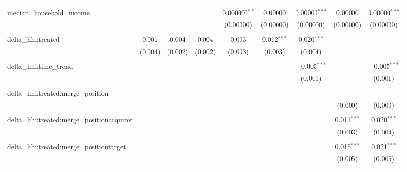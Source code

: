 \begin{table}[H]
{\begin{tabular}{@{\extracolsep{5pt}}lcccccccc}
   & & & & & & & & \\  

  median\_household\_income &  &  &  & 0.00000$^{***}$ & 0.00000 & 0.00000$^{***}$ & 0.00000 & 0.00000$^{***}$ \\  

   &  &  &  & (0.00000) & (0.00000) & (0.00000) & (0.00000) & (0.00000) \\  

   & & & & & & & & \\  

  delta\_hhi:treated & 0.001 & 0.004 & 0.004 & 0.003 & 0.012$^{***}$ & 0.020$^{***}$ &  &  \\  

   & (0.004) & (0.002) & (0.002) & (0.003) & (0.003) & (0.004) &  &  \\  

   & & & & & & & & \\  

  delta\_hhi:time\_trend &  &  &  &  &  & $-$0.005$^{***}$ &  & $-$0.005$^{***}$ \\  

   &  &  &  &  &  & (0.001) &  & (0.001) \\  

   & & & & & & & & \\  

  delta\_hhi:treated:merge\_position &  &  &  &  &  &  &  &  \\  

   &  &  &  &  &  &  & (0.000) & (0.000) \\  

   & & & & & & & & \\  

  delta\_hhi:treated:merge\_positionacquiror &  &  &  &  &  &  & 0.011$^{***}$ & 0.020$^{***}$ \\  

   &  &  &  &  &  &  & (0.003) & (0.004) \\  

   & & & & & & & & \\  

  delta\_hhi:treated:merge\_positiontarget &  &  &  &  &  &  & 0.015$^{***}$ & 0.021$^{***}$ \\  

   &  &  &  &  &  &  & (0.005) & (0.006) \\  

   & & & & & & & & \\  


\end{tabular}}
\end{table}
